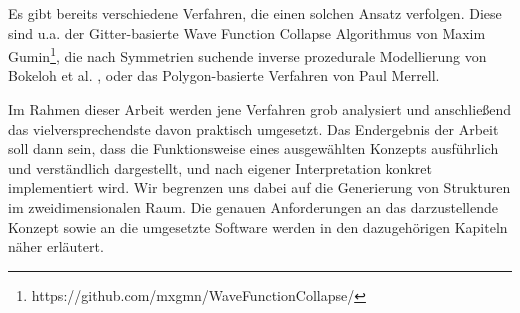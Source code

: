 Es gibt bereits verschiedene Verfahren, die einen solchen Ansatz verfolgen. Diese sind u.a. der Gitter-basierte Wave Function
Collapse Algorithmus von Maxim Gumin\footnote{https://github.com/mxgmn/WaveFunctionCollapse/}, die nach Symmetrien suchende inverse
prozedurale Modellierung von Bokeloh et al. \cite{3_bokeloh_et_al}, oder das Polygon-basierte Verfahren von Paul Merrell. \cite{1_merrell}

Im Rahmen dieser Arbeit werden jene Verfahren grob analysiert und anschließend das vielversprechendste davon praktisch umgesetzt. Das Endergebnis
der Arbeit soll dann sein, dass die Funktionsweise eines ausgewählten Konzepts ausführlich und verständlich dargestellt, und nach eigener
Interpretation konkret implementiert wird. Wir begrenzen uns dabei auf die Generierung von Strukturen im zweidimensionalen Raum. Die genauen
Anforderungen an das darzustellende Konzept sowie an die umgesetzte Software werden in den dazugehörigen Kapiteln näher erläutert.